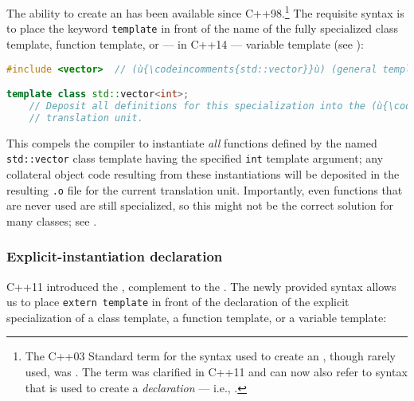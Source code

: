 The ability to create an  has been available since C++98.{\cprotect\footnote{The
  C++03 Standard term for the syntax used to create an
  , though rarely used,
  was . The term
   was clarified in
  C++11 and can now also refer to syntax that is used to create a
  \emph{declaration} --- i.e., .}} The requisite syntax is to place the keyword
\lstinline!template! in front of the name of the fully specialized class
template, function template, or --- in C++14 --- variable
template (see ):

\begin{lstlisting}[language=C++]
#include <vector>  // (ù{\codeincomments{std::vector}}ù) (general template)

template class std::vector<int>;
    // Deposit all definitions for this specialization into the (ù{\codeincomments{.o}}ù) for this
    // translation unit.
\end{lstlisting}
    
\noindent This  compels the compiler to
instantiate \emph{all} functions defined by the named
\lstinline!std::vector! class template having the specified \lstinline!int!
template argument; any collateral object code resulting from these
instantiations will be deposited in the resulting \lstinline!.o! file for
the current translation unit. Importantly, even functions that are never
used are still specialized, so this might not be the correct solution
for many classes; see .

\subsubsection[Explicit-instantiation declaration]{Explicit-instantiation declaration}\label{explicit-instantiation-declaration}

C++11 introduced the ,
complement to the . The
newly provided syntax allows us to place
\lstinline!extern!~\lstinline!template! in front of the declaration of the
explicit specialization of a class template, a function template, or a
variable template: %

